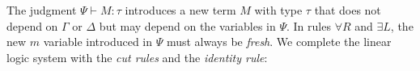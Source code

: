 

The judgment $\Psi \vdash M : \tau$ introduces a new term $M$ with type $\tau$
that does not depend on $\Gamma$ or $\Delta$ but may depend on the variables in
$\Psi$. In rules $\forall R$ and $\exists L$, the new $m$ variable introduced in
$\Psi$ must always be \emph{fresh}. We complete the linear logic system with the
\emph{cut rules} and the \emph{identity rule}:



